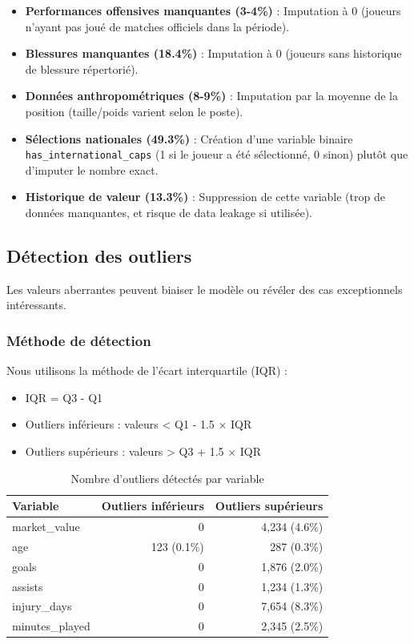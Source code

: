 \documentclass[12pt,a4paper]{article}
\begin{document}
\begin{itemize}[leftmargin=*]
    \item \textbf{Performances offensives manquantes (3-4\%)} : Imputation à 0 (joueurs n'ayant pas joué de matches officiels dans la période).
    
    \item \textbf{Blessures manquantes (18.4\%)} : Imputation à 0 (joueurs sans historique de blessure répertorié).
    
    \item \textbf{Données anthropométriques (8-9\%)} : Imputation par la moyenne de la position (taille/poids varient selon le poste).
    
    \item \textbf{Sélections nationales (49.3\%)} : Création d'une variable binaire \texttt{has\_international\_caps} (1 si le joueur a été sélectionné, 0 sinon) plutôt que d'imputer le nombre exact.
    
    \item \textbf{Historique de valeur (13.3\%)} : Suppression de cette variable (trop de données manquantes, et risque de data leakage si utilisée).
\end{itemize}

\subsection{Détection des outliers}

Les valeurs aberrantes peuvent biaiser le modèle ou révéler des cas exceptionnels intéressants.

\subsubsection{Méthode de détection}

Nous utilisons la méthode de l'écart interquartile (IQR) :
\begin{itemize}[leftmargin=*]
    \item IQR = Q3 - Q1
    \item Outliers inférieurs : valeurs < Q1 - 1.5 × IQR
    \item Outliers supérieurs : valeurs > Q3 + 1.5 × IQR
\end{itemize}

\begin{table}[h]
\centering
\begin{tabular}{@{}lrr@{}}
\toprule
\textbf{Variable} & \textbf{Outliers inférieurs} & \textbf{Outliers supérieurs} \\ \midrule
market\_value & 0 & 4,234 (4.6\%) \\
age & 123 (0.1\%) & 287 (0.3\%) \\
goals & 0 & 1,876 (2.0\%) \\
assists & 0 & 1,234 (1.3\%) \\
injury\_days & 0 & 7,654 (8.3\%) \\
minutes\_played & 0 & 2,345 (2.5\%) \\ \bottomrule
\end{tabular}
\caption{Nombre d'outliers détectés par variable}
\end{table}
\end{document}
